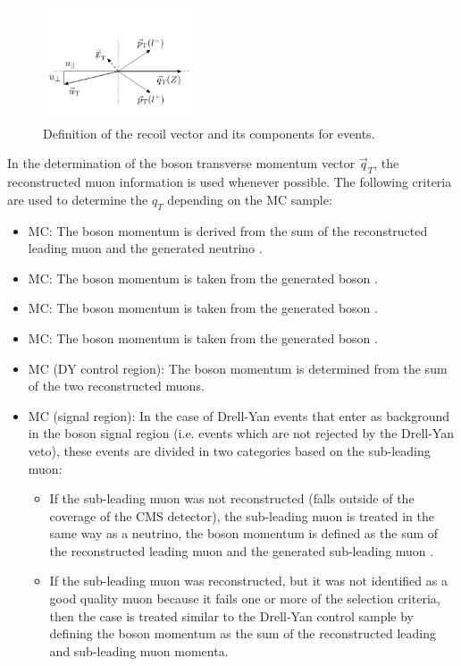 \begin{figure}
\begin{center}
\includegraphics[width=0.4\textwidth]{Figures/WBoson/Analysis/Correction/Recoil/Recoil_Definition.pdf}
\caption{Definition of the recoil vector and its components for \ZToMuMu events.}
\label{fig:RecoilDefinition}
\end{center}
\end{figure}
 
In the determination of the boson transverse momentum vector $\vec{q}_{T}$, the reconstructed muon information is used whenever possible. The following criteria are used to determine the $q_{T}$ depending on the MC sample:

\begin{itemize}

\item \WToMuNu MC: The boson momentum is derived from the sum of the reconstructed leading muon \pt and the generated neutrino \pt.
\item \WToTauNu MC: The boson momentum is taken from the generated \W boson \pt.
\item \ttbar MC: The boson momentum is taken from the generated \W boson \pt.
\item \DYToTauTau MC: The boson momentum is taken from the generated \DY boson \pt.
\item \DYToMuMu MC (DY control region): The boson momentum is determined from the sum of the two reconstructed muons.
\item \DYToMuMu MC (\W signal region): In the case of Drell-Yan events that enter as background in the \W boson signal region (i.e. events which are not rejected by the Drell-Yan veto), these events are divided in two categories based on the sub-leading muon:
\begin{itemize}
\item If the sub-leading muon was not reconstructed (falls outside of the coverage of the CMS detector), the sub-leading muon is treated in the same way as a neutrino, the boson momentum is defined as the sum of the reconstructed leading muon \pt and the generated sub-leading muon \pt.
\item If the sub-leading muon was reconstructed, but it was not identified as a good quality muon because it fails one or more of the selection criteria, then the case is treated similar to the Drell-Yan control sample by defining the boson momentum as the sum of the reconstructed leading and sub-leading muon momenta.
\end{itemize}
\end{itemize}

